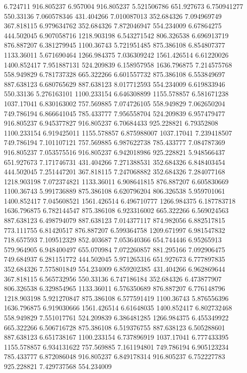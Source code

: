 6.724711	916.805237
6.957004	916.805237
5.521506786	651.927673
6.750941277	550.33136
7.060578346	431.404266
7.010087013	352.684326
7.094969749	367.818115
6.979634762	352.684326
7.872046947	554.234009
6.67864275	444.502045
6.907058716	1218.903198
6.543271542	806.326538
6.696913719	876.887207
6.381279945	1100.36743
5.721951485	875.386108
6.854807377	1133.36011
5.671690464	1266.984375
7.036309242	1561.426514
6.61220026	1400.852417
7.951887131	524.209839
6.158957958	1636.796875
7.214575768	558.949829
6.781737328	665.322266
6.601557732	875.386108
6.553849697	887.638123
6.680765629	887.638123
8.017712593	554.234009
6.619833946	550.33136
5.276163101	1100.233154
6.646308899	1155.578857
6.581671238	1037.17041
6.830163002	757.569885
7.074726105	558.949829
7.062650204	749.786194
6.866641045	785.433777
7.956558704	524.209839
6.957479477	916.805237
6.945377827	916.805237
6.70684433	925.228821
6.79352808	1100.233154
6.919425011	1155.578857
6.875988007	1037.17041
7.239418507	749.786194
7.101107121	757.569885
6.987622738	785.433777
7.084787369	916.805237
7.053575516	916.805237
6.942018986	925.228821
5.948566437	651.927673
7.171746731	431.404266
7.271388531	352.684326
6.848403454	444.502045
7.251447201	367.818115
7.247068882	352.684326
7.284077168	1218.903198
7.072374821	1133.36011
6.908641815	876.887207
6.605830669	1100.36743
5.991736889	875.386108
6.620796204	806.326538
5.959701061	1400.852417
7.045608521	1561.426514
6.496710777	1266.984375
6.187783718	1636.796875
6.782144547	875.386108
6.923316002	665.322266
6.569024563	887.638123
6.498794079	887.638123
7.014377117	874.982056
6.882517815	773.111755
6.81420517	876.887207
6.599364758	1209.671997
6.981547832	718.657593
7.109512329	852.403687
7.053640366	654.744446
6.95265913	579.964905
6.948400497	655.070984
7.072260857	881.295166
7.092906475	749.684937
6.281151772	444.502045
5.971265316	651.927673
6.777897835	352.684326
7.575801849	554.234009
6.859202385	431.404266
6.962869644	367.818115
6.565732956	550.33136
6.747186184	352.684326
6.473877907	806.326538
6.329854965	1133.36011
6.576350689	876.887207
6.776148796	1218.903198
5.921270847	875.386108
6.577591419	1100.36743
5.876556396	1636.796875
6.919030666	1561.426514
6.61648035	1400.852417
6.802732468	558.949829
7.551017761	524.209839
6.386481285	1266.984375
6.455349922	665.322266
6.506716728	875.386108
6.519376755	887.638123
6.505288601	887.638123
6.651738167	1100.233154
6.737896919	1037.17041
6.777433395	1155.578857
6.934131622	757.569885
7.161194801	749.786194
6.905123234	785.433777
6.872086048	916.805237
6.849178314	916.805237
6.752227783	925.228821
7.429737568	554.234009
